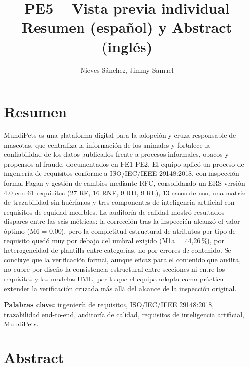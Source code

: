 \documentclass[12pt,a4paper]{article}
\title{PE5 -- Vista previa individual\\Resumen (español) y Abstract (inglés)}
\author{Nieves Sánchez, Jimmy Samuel}
\date{}
\begin{document}
\maketitle



\section*{Resumen}

MundiPets es una plataforma digital para la adopción y cruza responsable de
mascotas, que centraliza la información de los animales y fortalece la
confiabilidad de los datos publicados frente a procesos informales, opacos y
propensos al fraude, documentados en PE1-PE2. El equipo aplicó un proceso de
ingeniería de requisitos conforme a ISO/IEC/IEEE 29148:2018, con inspección
formal Fagan y gestión de cambios mediante RFC, consolidando un ERS versión
4.0 con 61 requisitos (27 RF, 16 RNF, 9 RD, 9 RL), 13 casos de uso, una
matriz de trazabilidad sin huérfanos y tres componentes de inteligencia
artificial con requisitos de equidad medibles. La auditoría de calidad
mostró resultados dispares entre las seis métricas: la corrección tras la
inspección alcanzó el valor óptimo (M6 = 0,00), pero la completitud
estructural de atributos por tipo de requisito quedó muy por debajo del
umbral exigido (M1a = 44,26\,\%), por heterogeneidad de plantilla entre
categorías, no por errores de contenido. Se concluye que la verificación
formal, aunque eficaz para el contenido que audita, no cubre por diseño la
consistencia estructural entre secciones ni entre los requisitos y los
modelos UML, por lo que el equipo adopta como práctica extender la
verificación cruzada más allá del alcance de la inspección original.

\textbf{Palabras clave:} ingeniería de requisitos, ISO/IEC/IEEE 29148:2018,
trazabilidad end-to-end, auditoría de calidad, requisitos de inteligencia
artificial, MundiPets.

\bigskip

\section*{Abstract}
\end{document}
